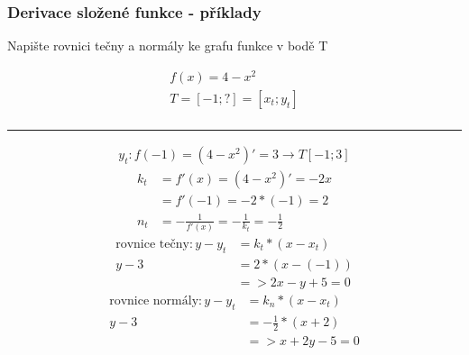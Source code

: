 \subsubsection{Derivace složené funkce - příklady}
\begin{center}
  Napište rovnici tečny a normály ke grafu funkce v bodě T
\end{center}
\begin{align*}
  f(x)=4-x^2 \\
  T=[-1;?]=[x_t;y_t]\\
\end{align*}
\hrule
\begin{align*}
  y_t: f(-1)=(4-x^2)'=3
  \rightarrow T[-1;3]
\end{align*}
\begin{align*}
  k_t&=f'(x)=(4-x^2)'=-2x \\
  &=f'(-1)=-2*(-1)=2 \\
  n_t&=-\frac{1}{f'(x)}=-\frac{1}{k_t}=-\frac{1}{2}
\end{align*}
\begin{align*}
  \text{rovnice tečny}: y-y_t&=k_t*(x-x_t) \\
  y-3&=2*(x-(-1)) \\
  &=> 2x-y+5=0
\end{align*}
\begin{align*}
  \text{rovnice normály}: y-y_t&=k_n*(x-x_t) \\
  y-3&=-\frac{1}{2}*(x+2) \\
  &=> x+2y-5=0
\end{align*}
